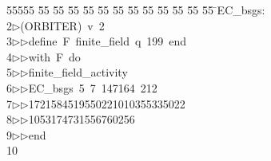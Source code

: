 %
%
\begin{tabbing}
55555 \= 55 \= 55 \= 55 \= 55 \= 55 \= 55 \= 55 \= 55 \= 55 \= 55 \= 55 \= 55 \= \>EC\_bsgs:\\[0pt]
2\>$\triangleright$\>(ORBITER)\ v\ 2\ \\[0pt]
3\>$\triangleright$\>$\triangleright$\>define\ F\ finite\_field\ q\ 199\ end\ \\[0pt]
4\>$\triangleright$\>$\triangleright$\>with\ F\ do\ \\[0pt]
5\>$\triangleright$\>$\triangleright$\>finite\_field\_activity\ \\[0pt]
6\>$\triangleright$\>$\triangleright$\>EC\_bsgs\ 5\ 7\ 147164\ 212\ \\[0pt]
7\>$\triangleright$\>$\triangleright$\>1721584519550221010355335022\\[0pt]
8\>$\triangleright$\>$\triangleright$1053174731556760256\ \\[0pt]
9\>$\triangleright$\>$\triangleright$\>end\\[0pt]
10\>\end{tabbing}
